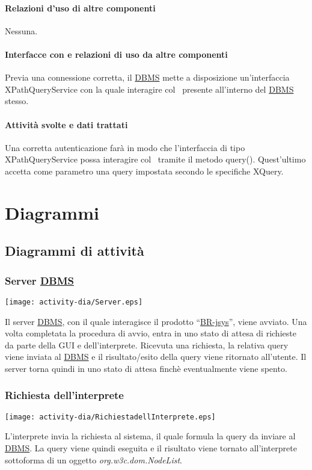 \subsubsection{Relazioni d'uso di altre componenti}
Nessuna.
\subsubsection{Interfacce con e relazioni di uso da altre componenti}
Previa una connessione corretta, il \underline{DBMS} mette a disposizione un'interfaccia XPathQueryService con la quale interagire col \rp\ presente all'interno del \underline{DBMS} stesso.
\subsubsection{Attivit\`a svolte e dati trattati}
Una corretta autenticazione far\`a in modo che l'interfaccia di tipo XPathQueryService possa interagire col \rp\ tramite il metodo query(). Quest'ultimo accetta come parametro una query impostata secondo le specifiche XQuery.

\chapter{Diagrammi}
\section{Diagrammi di attivit\`a}


\subsection{Server \underline{DBMS}}
\begin{center}
 \texttt{[image: activity-dia/Server.eps]}
\end{center}
Il server \underline{DBMS}, con il quale interagisce il prodotto ``\underline{BR-jsys}'', viene avviato. Una volta completata la procedura di avvio, entra in uno stato di attesa di richieste da parte della GUI e dell'interprete. Ricevuta una richiesta, la relativa query viene inviata al \underline{DBMS} e il risultato/esito della query viene ritornato all'utente. Il server torna quindi in uno stato di attesa finch\`e eventualmente viene spento.

\subsection{Richiesta dell'interprete}
\begin{center}
 \texttt{[image: activity-dia/RichiestadellInterprete.eps]}
\end{center}
L'interprete invia la richiesta al sistema, il quale formula la query da inviare al \underline{DBMS}. La query viene quindi eseguita e il risultato viene tornato all'interprete sottoforma di un oggetto \textit{org.w3c.dom.NodeList}.

